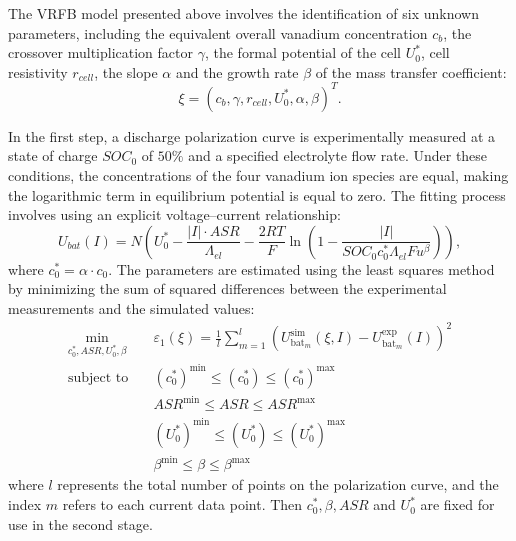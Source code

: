 The VRFB model presented above involves the identification of six unknown parameters, including the equivalent overall vanadium concentration $c_b$, the crossover multiplication factor $\gamma$, the formal potential of the cell $U_0^*$, cell resistivity $r_{c e l l}$, the slope $\alpha$ and the growth rate  $\beta$ of the mass transfer coefficient:
\begin{equation}
    \label{eq:idn}
    \xi=\left(c_b, \gamma, r_{c e l l}, U_0^*, \alpha, \beta\right)^T .
\end{equation}


In the first step, a discharge polarization curve is experimentally measured at a state of charge $S O C_0$ of $50 \%$ and a specified electrolyte flow rate. Under these conditions, the concentrations of the four vanadium ion species are equal, making the logarithmic term in equilibrium potential is equal to zero. The fitting process involves using an explicit voltage–current relationship:
\begin{equation}
    \label{eq:idt_ubat}
    U_{b a t}(I)=N\left(U_0^*-\frac{|I| \cdot A S R}{\Lambda_{e l}}-\frac{2 R T}{F} \ln \left(1-\frac{|I|}{S O C_0 c_0^* \Lambda_{e l} F u^\beta}\right)\right),
\end{equation}
where $c_0^*=\alpha \cdot c_0$. The parameters are estimated using the least squares method by minimizing the sum of squared differences between the experimental measurements and the simulated values:
\begin{equation}
\begin{aligned}
\min_{c_0^*, ASR, U_0^*, \beta} \quad 
& \varepsilon_1(\xi) = \frac{1}{l} \sum_{m=1}^{l} \left(U^{\text{sim}}_{\text{bat}_m}(\xi, I) - U^{\text{exp}}_{\text{bat}_m}(I)\right)^2 \\
\text{subject to} \quad 
& (c_0^*)^{\min} \leq (c_0^*) \leq (c_0^*)^{\max} \\
& ASR^{\min} \leq ASR \leq ASR^{\max} \\
& (U_0^*)^{\min} \leq (U_0^*) \leq (U_0^*)^{\max} \\
& \beta^{\min} \leq \beta \leq \beta^{\max}
\end{aligned}
\end{equation}
where $l$ represents the total number of points on the polarization curve, and the index $m$ refers to each current data point. Then $c_0^*, \beta, A S R$ and $U_0^*$ are fixed for use in the second stage.

